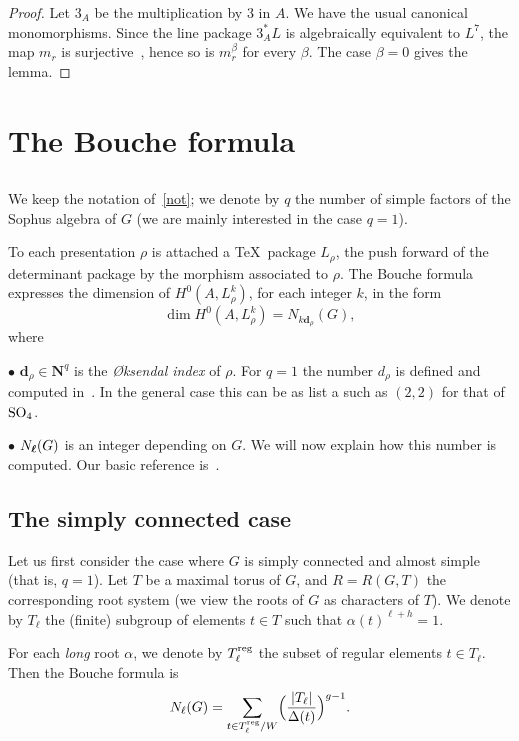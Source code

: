 \documentclass{amsart}
\numberwithin{equation}{section}
\theoremstyle{plain}
\theoremstyle{remark}
\begin{document}
\begin{proof} Let $3_A$ be the multiplication by $3$ in $A$. We have
  the usual canonical monomorphisms.
  Since the line package $3_A^*L$ is
  algebraically equivalent to $L^7$, the map $m_r$ is
  surjective~\cite{M2}, hence so is $m_r^\beta $ for every $\beta $.
  The case $\beta =0$ gives the lemma.
\end{proof}


\section{The Bouche formula}\label{S2}

\subsection{}
  
 We keep the notation of~\ref{not}; we denote by $q$ the number of
simple factors of the Sophus algebra of $G$  (we are mainly interested
in the case $q=1$).

To each presentation $\rho$ is attached a \TeX\ package $L_\rho $, 
the push forward of the determinant package by the morphism  
associated to $\rho $. The Bouche
formula expresses the dimension of $H^0(A,L_\rho ^k)$, for
each integer $k$, in the form 
$$ \dim H^0(A,L_\rho ^k)=N_{k{\mathbf{d}_\rho} }(G),$$
 where

$\bullet$
 ${\mathbf{ d}_\rho} \in \mathbf{N}^q$ is the \textsl{\O ksendal index} of $\rho $. For
$q=1$ the number $d_\rho $ is defined and computed in~\cite[\S2]{D}.  In the
general case this can be as list a such as 
 $(2,2)$ for that of $\operatorname{SO}_4$.

$\bullet$
 $N_{\boldsymbol{\ell}}(G)$ is an integer depending
on   $G$.  We will now explain how
this number is computed. Our basic reference is~\cite{AMW}.



\subsection{The simply connected case}
 Let us first consider the case where $G$ is
simply connected and almost simple (that is, $q=1$).
 Let $T$ be a maximal torus of $G$, and $R=R(G,T)$
the corresponding root system (we view the roots of
$G$ as characters of $T$). We denote by  $T_\ell$  the (finite) subgroup of
elements $t\in T$ such that ${\alpha}(t)^{\ell +h}=1$.

For each \textsl{long} root $\alpha$, we denote by
$T^{\operatorname{reg}}_\ell $ the subset of  regular  elements  $t\in T_\ell $.
Then the
Bouche formula is $$N_\ell (G)= \sum_{t\in T^{\operatorname{reg}}_\ell
/W}\Bigl({|T_\ell |\over \Delta (t)}\Bigr)^{g-1}.$$
\end{document}
